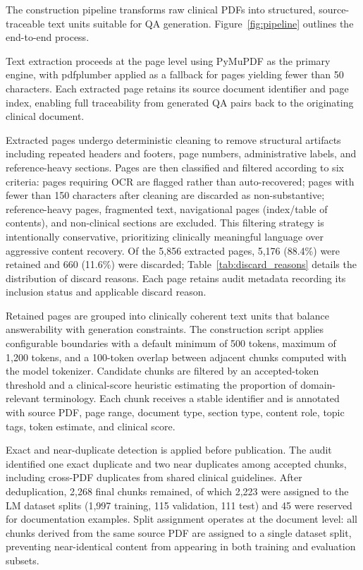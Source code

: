 \documentclass[conference]{IEEEtran}
\begin{document}
The construction pipeline transforms raw clinical PDFs into structured, source-traceable text units suitable for QA generation. Figure~\ref{fig:pipeline} outlines the end-to-end process.

Text extraction proceeds at the page level using PyMuPDF as the primary engine, with pdfplumber applied as a fallback for pages yielding fewer than 50 characters. Each extracted page retains its source document identifier and page index, enabling full traceability from generated QA pairs back to the originating clinical document.

Extracted pages undergo deterministic cleaning to remove structural artifacts including repeated headers and footers, page numbers, administrative labels, and reference-heavy sections. Pages are then classified and filtered according to six criteria: pages requiring OCR are flagged rather than auto-recovered; pages with fewer than 150 characters after cleaning are discarded as non-substantive; reference-heavy pages, fragmented text, navigational pages (index/table of contents), and non-clinical sections are excluded. This filtering strategy is intentionally conservative, prioritizing clinically meaningful language over aggressive content recovery. Of the 5,856 extracted pages, 5,176 (88.4\%) were retained and 660 (11.6\%) were discarded; Table~\ref{tab:discard_reasons} details the distribution of discard reasons. Each page retains audit metadata recording its inclusion status and applicable discard reason.

Retained pages are grouped into clinically coherent text units that balance answerability with generation constraints. The construction script applies configurable boundaries with a default minimum of 500 tokens, maximum of 1,200 tokens, and a 100-token overlap between adjacent chunks computed with the model tokenizer. Candidate chunks are filtered by an accepted-token threshold and a clinical-score heuristic estimating the proportion of domain-relevant terminology. Each chunk receives a stable identifier and is annotated with source PDF, page range, document type, section type, content role, topic tags, token estimate, and clinical score.

Exact and near-duplicate detection is applied before publication. The audit identified one exact duplicate and two near duplicates among accepted chunks, including cross-PDF duplicates from shared clinical guidelines. After deduplication, 2,268 final chunks remained, of which 2,223 were assigned to the LM dataset splits (1,997 training, 115 validation, 111 test) and 45 were reserved for documentation examples. Split assignment operates at the document level: all chunks derived from the same source PDF are assigned to a single dataset split, preventing near-identical content from appearing in both training and evaluation subsets.
\end{document}
